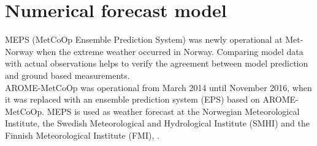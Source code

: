 \chapter{Numerical forecast model} \label{ch:MEPS}
MEPS (MetCoOp Ensemble Prediction System) was newly operational at Met-Norway when the extreme weather occurred in Norway. Comparing model data with actual observations helps to verify the agreement between model prediction and ground based measurements. 
\\
AROME-MetCoOp was operational from March 2014 until November 2016, when it was replaced with an ensemble prediction system (EPS) based on AROME-MetCoOp.
MEPS is used as weather forecast at the Norwegian Meteorological Institute, the Swedish Meteorological and Hydrological Institute (SMHI) and the Finnish Meteorological Institute (FMI), \citep{muller_arome-metcoop:_2017, koltzow_metcoop_2017}.

